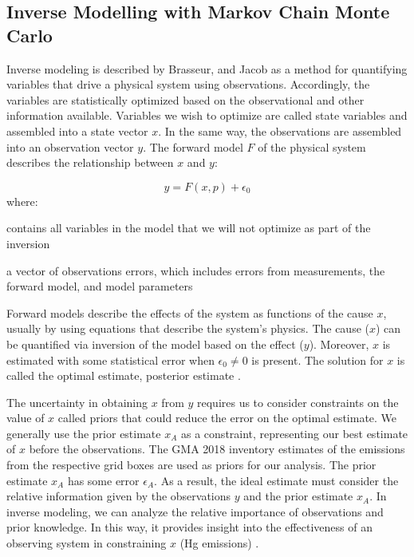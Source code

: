 \subsection{ Inverse Modelling with Markov Chain Monte Carlo}\label{c3_mcmc}
\begin{flushleft}
    Inverse modeling is described by Brasseur, and Jacob \cite{brasseur_modeling_2017} as a method for quantifying variables that drive a physical system using observations. Accordingly, the variables are statistically optimized based on the observational and other information available. Variables we wish to optimize are called state variables and assembled into a state vector $x$. In the same way, the observations are assembled into an observation vector $y$. The forward model $F$ of the physical system describes the relationship between $x$ and $y$:

    \begin{equation}
\label{inverse_model}
y=F(x,p) + \epsilon_0
\end{equation}
where:\\
\begin{description}[leftmargin=!,labelwidth={3 em}]
    \item [$p$] contains all variables in the model that we will not optimize as part of the inversion
    \item [$\epsilon_0$] a vector of observations errors, which includes errors from measurements, the forward model, and model parameters 
\end{description}
 Forward models describe the effects of the system as functions of the cause $x$, usually by using equations that describe the system's physics. The cause ($x$) can be quantified via inversion of the model based on the effect ($y$). Moreover, $x$ is estimated with some statistical error when $\epsilon_0 \neq 0$ is present. The solution for $x$ is called the optimal estimate, posterior estimate \cite{brasseur_modeling_2017}. 
 \end{flushleft}

\begin{flushleft}
    The uncertainty in obtaining $x$ from $y$ requires us to consider constraints on the value of $x$ called priors that could reduce the error on the optimal estimate.  We generally use the prior estimate $x_A$ as a constraint, representing our best estimate of $x$ before the observations. The GMA 2018 inventory estimates of the emissions from the respective grid boxes are used as priors for our analysis. The prior estimate $x_A$ has some error $\epsilon_A$. As a result, the ideal estimate must consider the relative information given by the observations $y$ and the prior estimate $x_A$. In inverse modeling, we can analyze the relative importance of observations and prior knowledge. In this way, it provides insight into the effectiveness of an observing system in constraining $x$ (Hg emissions) \cite{brasseur_modeling_2017}.

    \end{flushleft}

